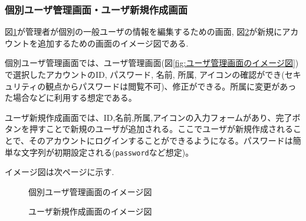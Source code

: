 \documentclass[11ptm]{jsarticle}
\begin{document}
\clearpage
\subsubsection{個別ユーザ管理画面・ユーザ新規作成画面}
\label{sec:個別ユーザ管理画面・ユーザ新規作成画面}
図\ref{fig:個別ユーザ管理画面のイメージ図}が管理者が個別の一般ユーザの情報を編集するための画面, 図\ref{fig:ユーザ新規作成画面のイメージ図}が新規にアカウントを追加するための画面のイメージ図である. \par
個別ユーザ管理画面では、ユーザ管理画面(図\ref{fig:ユーザ管理画面のイメージ図})で選択したアカウントのID, パスワード, 名前, 所属, アイコンの確認ができ(セキュリティの観点からパスワードは閲覧不可)、修正ができる。所属に変更があった場合などに利用する想定である。\par
ユーザ新規作成画面では、ID,名前,所属,アイコンの入力フォームがあり、完了ボタンを押すことで新規のユーザが追加される。ここでユーザが新規作成されることで、そのアカウントにログインすることができるようになる。パスワードは簡単な文字列が初期設定される({\tt password}など想定)。\par
イメージ図は次ページに示す.
\clearpage
\begin{figure}[h]
  \centering
  \caption{\label{fig:個別ユーザ管理画面のイメージ図}個別ユーザ管理画面のイメージ図}
\end{figure}
\begin{figure}[h]
  \centering
  \caption{\label{fig:ユーザ新規作成画面のイメージ図}ユーザ新規作成画面のイメージ図}
\end{figure}
\end{document}
